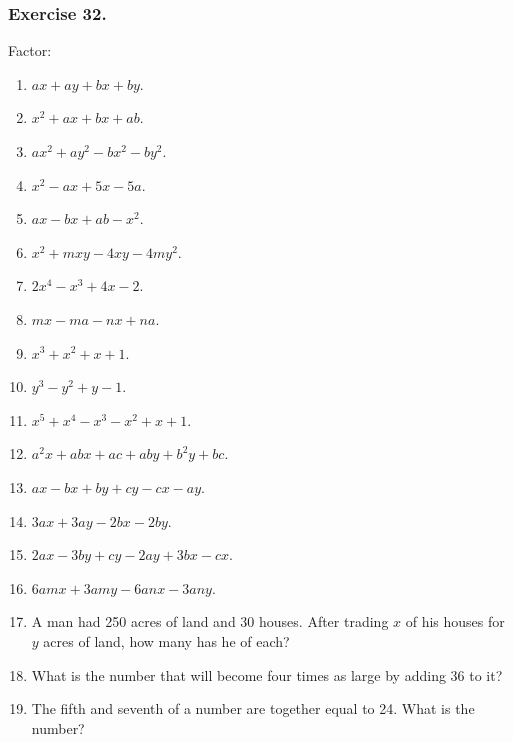 \documentclass{book}
\begin{document}
\subsubsection*{Exercise 32.}

Factor:
\begin{enumerate}
\item $ax+ay+bx+by$.

\item $x^2+ax+bx+ab$.

\item $ax^2+ay^2-bx^2-by^2$.

\item $x^2-ax+5x-5a$.

\item $ax-bx+ab-x^2$.

\item $x^2+mxy-4xy-4my^2$.

\item $2x^4-x^3+4x-2$.

\item $mx-ma-nx+na$.

\item $x^3+x^2+x+1$.

\item $y^3-y^2+y-1$.

\item $x^5+x^4-x^3-x^2+x+1$.

\item $a^2x+abx+ac+aby+b^2y+bc$.

\item $ax-bx+by+cy-cx-ay$.

\item $3ax+3ay-2bx-2by$.

\item $2ax-3by+cy-2ay+3bx-cx$.

\item $6amx+3amy-6anx-3any$.

\item A man had 250 acres of land and 30 houses. After trading $x$
of his houses for $y$ acres of land, how many has he of each?

\item What is the number that will become four times as large by
adding 36 to it?

\item The fifth and seventh of a number are together equal to 24.
What is the number?

\end{enumerate}
\end{document}
